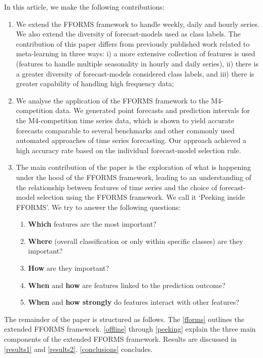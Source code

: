 \documentclass[11pt,a4paper,]{article}
\providecommand{\tightlist}{%
  \setlength{\itemsep}{0pt}\setlength{\parskip}{0pt}}
\begin{document}
In this article, we make the following contributions:

\begin{enumerate}
\def\labelenumi{\arabic{enumi}.}
\tightlist
\item
  We extend the FFORMS framework to handle weekly, daily and hourly series. We also extend the diversity of forecast-models used as class labels. The contribution of this paper differs from previously published work related to meta-learning \autocites{prudencio2004meta}{lemke2010meta}{kuck2016meta} in three ways: i) a more extensive collection of features is used (features to handle multiple seasonality in hourly and daily series), ii) there is a greater diversity of forecast-models considered class labels, and iii) there is greater capability of handling high frequency data;
\item
  We analyse the application of the FFORMS framework to the M4-competition data. We generated point forecasts and prediction intervals for the M4-competition time series data, which is shown to yield accurate forecasts comparable to several benchmarks and other commonly used automated approaches of time series forecasting. Our approach achieved a high accuracy rate based on the individual forecast-model selection rule.
\item
  The main contribution of the paper is the exploration of what is happening under the hood of the FFORMS framework, leading to an understanding of the relationship between features of time series and the choice of forecast-model selection using the FFORMS framework. We call it `Peeking inside FFORMS'. We try to answer the following questions:

  \begin{enumerate}
  \def\labelenumii{\roman{enumii})}
  \tightlist
  \item
    \textbf{Which} features are the most important?
  \item
    \textbf{Where} (overall classification or only within specific classes) are they important?
  \item
    \textbf{How} are they important?
  \item
    \textbf{When} and \textbf{how} are features linked to the prediction outcome?
  \item
    \textbf{When} and \textbf{how strongly} do features interact with other features?
  \end{enumerate}
\end{enumerate}

The remainder of the paper is structured as follows. The \autoref{fforms} outlines the extended FFORMS framework. \autoref{offline} through \autoref{peeking} explain the three main components of the extended FFORMS framework. Results are discussed in \autoref{results1} and \autoref{results2}. \autoref{conclusions} concludes.
\end{document}
